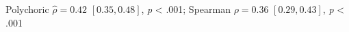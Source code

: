 Polychoric $\hat{\rho}=0.42$ \([0.35, 0.48]\), \textit{p} < .001; Spearman $\rho=0.36$ \([0.29, 0.43]\), \textit{p} < .001%
